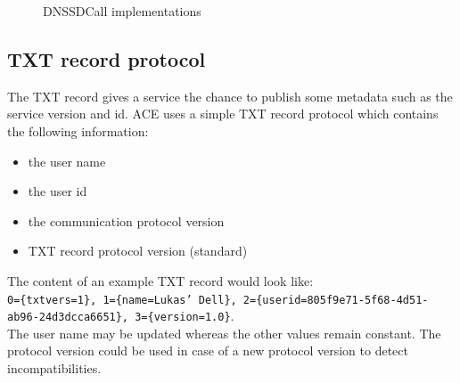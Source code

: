 \begin{figure}[H]
 \centering
 \caption{DNSSDCall implementations}
 \label{fig:network.discovery.dnssdCall.impl}
\end{figure}


\subsection{TXT record protocol}
The TXT record gives a service the chance to publish some metadata such as the service version and id. ACE uses a simple TXT record protocol which contains the following information:

\begin{itemize}
\item the user name
\item the user id
\item the communication protocol version
\item TXT record protocol version (standard)
\end{itemize}

The content of an example TXT record would look like: \\
\texttt{0=\{txtvers=1\}, 1=\{name=Lukas' Dell\}, 2=\{userid=805f9e71-5f68-4d51-ab96-24d3dcca6651\}, 3=\{version=1.0\}}.\\The user name may be updated whereas the other values remain constant. The protocol version could be used in case of a new protocol version to detect incompatibilities.

